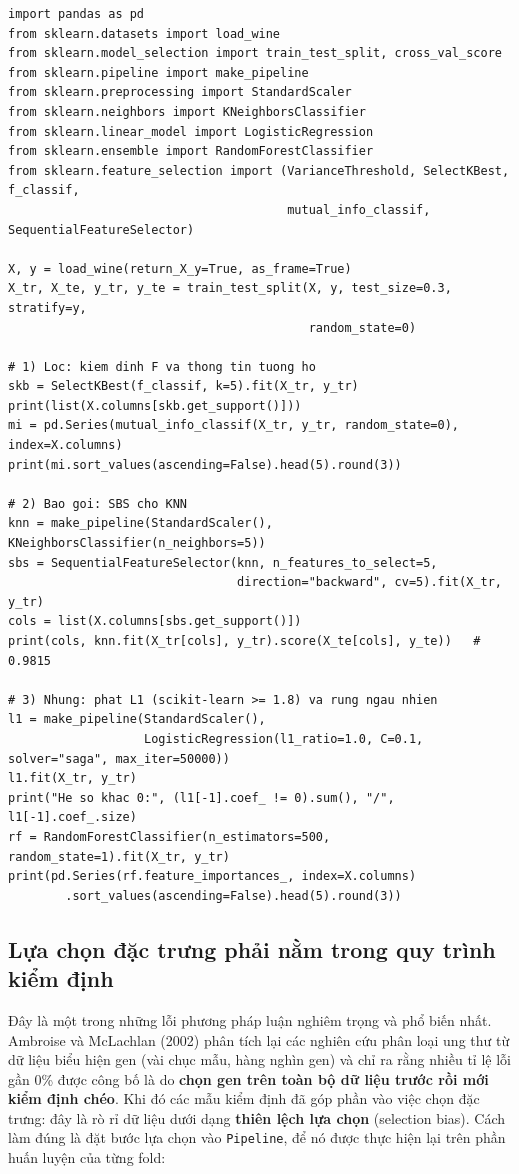 \begin{lstlisting}[caption={Ba họ phương pháp lựa chọn đặc trưng trên bộ dữ liệu Wine}]
import pandas as pd
from sklearn.datasets import load_wine
from sklearn.model_selection import train_test_split, cross_val_score
from sklearn.pipeline import make_pipeline
from sklearn.preprocessing import StandardScaler
from sklearn.neighbors import KNeighborsClassifier
from sklearn.linear_model import LogisticRegression
from sklearn.ensemble import RandomForestClassifier
from sklearn.feature_selection import (VarianceThreshold, SelectKBest, f_classif,
                                       mutual_info_classif, SequentialFeatureSelector)

X, y = load_wine(return_X_y=True, as_frame=True)
X_tr, X_te, y_tr, y_te = train_test_split(X, y, test_size=0.3, stratify=y,
                                          random_state=0)

# 1) Loc: kiem dinh F va thong tin tuong ho
skb = SelectKBest(f_classif, k=5).fit(X_tr, y_tr)
print(list(X.columns[skb.get_support()]))
mi = pd.Series(mutual_info_classif(X_tr, y_tr, random_state=0), index=X.columns)
print(mi.sort_values(ascending=False).head(5).round(3))

# 2) Bao goi: SBS cho KNN
knn = make_pipeline(StandardScaler(), KNeighborsClassifier(n_neighbors=5))
sbs = SequentialFeatureSelector(knn, n_features_to_select=5,
                                direction="backward", cv=5).fit(X_tr, y_tr)
cols = list(X.columns[sbs.get_support()])
print(cols, knn.fit(X_tr[cols], y_tr).score(X_te[cols], y_te))   # 0.9815

# 3) Nhung: phat L1 (scikit-learn >= 1.8) va rung ngau nhien
l1 = make_pipeline(StandardScaler(),
                   LogisticRegression(l1_ratio=1.0, C=0.1, solver="saga", max_iter=50000))
l1.fit(X_tr, y_tr)
print("He so khac 0:", (l1[-1].coef_ != 0).sum(), "/", l1[-1].coef_.size)
rf = RandomForestClassifier(n_estimators=500, random_state=1).fit(X_tr, y_tr)
print(pd.Series(rf.feature_importances_, index=X.columns)
        .sort_values(ascending=False).head(5).round(3))
\end{lstlisting}

\subsection{Lựa chọn đặc trưng phải nằm trong quy trình kiểm định}

Đây là một trong những lỗi phương pháp luận nghiêm trọng và phổ biến nhất. Ambroise và McLachlan (2002) phân tích lại các nghiên cứu phân loại ung thư từ dữ liệu biểu hiện gen (vài chục mẫu, hàng nghìn gen) và chỉ ra rằng nhiều tỉ lệ lỗi gần 0\% được công bố là do \textbf{chọn gen trên toàn bộ dữ liệu trước rồi mới kiểm định chéo}. Khi đó các mẫu kiểm định đã góp phần vào việc chọn đặc trưng: đây là rò rỉ dữ liệu dưới dạng \textbf{thiên lệch lựa chọn} (selection bias). Cách làm đúng là đặt bước lựa chọn vào \texttt{Pipeline}, để nó được thực hiện lại trên phần huấn luyện của từng fold:


